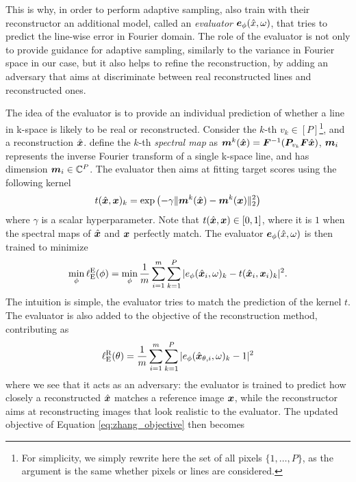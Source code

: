 This is why, in order to perform adaptive sampling, \citet{zhang2019reducing} also train with their reconstructor an additional model, called an \textit{evaluator} ${\bm{e}}_\phi(\hat{x},\omega)$, that tries to predict the line-wise error in Fourier domain. The role of the evaluator is not only to provide guidance for adaptive sampling, similarly to the variance in Fourier space in our case, but it also helps to refine the reconstruction, by adding an adversary that aims at discriminate between real reconstructed lines and reconstructed ones.

The idea of the evaluator is to provide an individual prediction of whether a line in k-space is likely to be real or reconstructed. Consider the $k$-th $v_k \in [P]$\footnote{For simplicity, we simply rewrite here the set of all pixels $\{1,\ldots,P\}$, as the argument is the same whether pixels or lines are considered.}, and a reconstruction $\hat{{\bm{x}}}$. \citet{zhang2019reducing} define the $k$-th \textit{spectral map} as ${\bm{m}}^k(\hat{{\bm{x}}}) = {\bm{F}}^{-1}({\bm{P}}_{v_k} {\bm{F}} \hat{{\bm{x}}})$, ${\bm{m}}_i$ represents the inverse Fourier transform of a single k-space line, and has dimension ${\bm{m}}_i \in \mathbb{C}^P$. The evaluator then aims at fitting target scores using the following kernel 
\begin{equation}
    t(\hat{{\bm{x}}},{\bm{x}})_k = \exp \left(-\gamma \| {\bm{m}}^k(\hat{{\bm{x}}}) - {\bm{m}}^k({\bm{x}})\|_2^2\right)
\end{equation}
where $\gamma$ is a scalar hyperparameter. Note that $t(\hat{{\bm{x}}},{\bm{x}}) \in [0,1]$, where it is $1$ when the spectral maps of $\hat{{\bm{x}}}$ and ${\bm{x}}$ perfectly match. The evaluator ${\bm{e}}_\phi(\hat{x},\omega)$ is then trained to minimize 
\begin{equation}
    \min_\phi \ell_{\text{E}}^{\text{E}}(\phi) = \min_\phi \frac{1}{m} \sum_{i=1}^m\sum_{k=1}^P |e_\phi(\hat{{\bm{x}}}_i,\omega)_k - t(\hat{{\bm{x}}}_i,{\bm{x}}_i)_k |^2.\label{eq:zhang_e}
\end{equation}
The intuition is simple, the evaluator tries to match the prediction of the kernel $t$. The evaluator is also added to the objective of the reconstruction method, contributing as
\begin{equation}
    \ell_{\text{E}}^{\text{R}}(\theta) = \frac{1}{m} \sum_{i=1}^m \sum_{k=1}^P |e_\phi(\hat{{\bm{x}}}_{\theta,i},\omega)_k - 1 |^2
\end{equation}
where we see that it acts as an adversary: the evaluator is trained to predict how closely a reconstructed $\hat{{\bm{x}}}$ matches a reference image ${\bm{x}}$, while the reconstructor aims at reconstructing images that look realistic to the evaluator. The updated objective of Equation \ref{eq:zhang_objective} then becomes 
